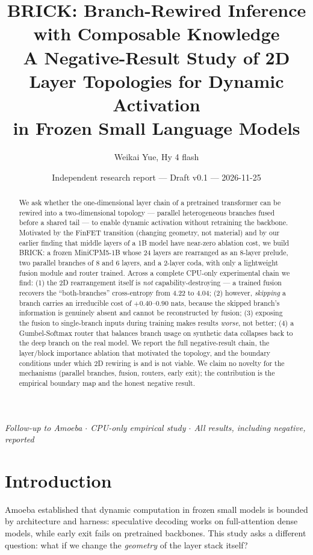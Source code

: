 \documentclass[11pt,a4paper]{article}
\title{\textbf{BRICK: Branch-Rewired Inference with Composable Knowledge}\\
\large A Negative-Result Study of 2D Layer Topologies for Dynamic Activation\\
\large in Frozen Small Language Models}
\author{Weikai Yue, Hy 4 flash}
\date{Independent research report --- Draft v0.1 --- 2026-11-25}
\begin{document}
\maketitle

\begin{center}
\textit{Follow-up to Amoeba \quad $\cdot$ \quad CPU-only empirical study \quad $\cdot$ \quad All results, including negative, reported}
\end{center}

\begin{abstract}
We ask whether the one-dimensional layer chain of a pretrained transformer can be
rewired into a two-dimensional topology --- parallel heterogeneous branches fused
before a shared tail --- to enable dynamic activation without retraining the backbone.
Motivated by the FinFET transition (changing geometry, not material) and by our earlier
finding that middle layers of a 1B model have near-zero ablation cost, we build BRICK:
a frozen MiniCPM5-1B whose 24 layers are rearranged as an 8-layer prelude, two parallel
branches of 8 and 6 layers, and a 2-layer coda, with only a lightweight fusion module
and router trained. Across a complete CPU-only experimental chain we find:
(1) the 2D rearrangement itself is \emph{not} capability-destroying --- a trained
fusion recovers the ``both-branches'' cross-entropy from 4.22 to 4.04;
(2) however, \emph{skipping} a branch carries an irreducible cost of $+0.40$--$0.90$ nats,
because the skipped branch's information is genuinely absent and cannot be reconstructed
by fusion; (3) exposing the fusion to single-branch inputs during training makes results
\emph{worse}, not better; (4) a Gumbel-Softmax router that balances branch usage on
synthetic data collapses back to the deep branch on the real model. We report the full
negative-result chain, the layer/block importance ablation that motivated the topology,
and the boundary conditions under which 2D rewiring is and is not viable. We claim no
novelty for the mechanisms (parallel branches, fusion, routers, early exit); the
contribution is the empirical boundary map and the honest negative result.
\end{abstract}

\section{Introduction}

Amoeba established that dynamic computation in frozen small models is bounded by
architecture and harness: speculative decoding works on full-attention dense models,
while early exit fails on pretrained backbones. This study asks a different question:
what if we change the \emph{geometry} of the layer stack itself?
\end{document}
